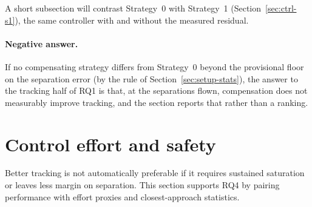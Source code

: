 

A short subsection will contrast Strategy~0 with Strategy~1 (Section~\ref{sec:ctrl-s1}), the same
controller with and without the measured residual.

\paragraph{Negative answer.} If no compensating strategy differs from Strategy~0 beyond the
provisional floor on the separation error (by the rule of Section~\ref{sec:setup-stats}), the answer to the tracking half of RQ1 is that, at
the separations flown, compensation does not measurably improve tracking, and the section reports
that rather than a ranking.

\section{Control effort and safety}
\label{sec:res2-effort}

Better tracking is not automatically preferable if it requires sustained saturation or leaves less
margin on separation. This section supports RQ4 by pairing performance with effort proxies and
closest-approach statistics.


